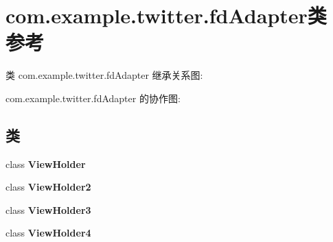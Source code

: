 \hypertarget{classcom_1_1example_1_1twitter_1_1fd_adapter}{}\section{com.\+example.\+twitter.\+fd\+Adapter类 参考}
\label{classcom_1_1example_1_1twitter_1_1fd_adapter}


类 com.\+example.\+twitter.\+fd\+Adapter 继承关系图\+:


com.\+example.\+twitter.\+fd\+Adapter 的协作图\+:
\subsection*{类}
\begin{DoxyCompactItemize}
\item 
class {\bfseries View\+Holder}
\item 
class {\bfseries View\+Holder2}
\item 
class {\bfseries View\+Holder3}
\item 
class {\bfseries View\+Holder4}
\end{DoxyCompactItemize}
